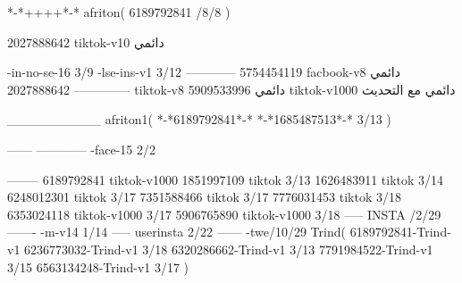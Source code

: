 *-*++++*-*
afriton(
6189792841 /8/8
)

2027888642 tiktok-v10
دائمي

-in-no-se-16 3/9
-lse-ins-v1 3/12
------------
5754454119 facbook-v8
دائمي
--------------
2027888642 tiktok-v8
دائمي
5909533996 tiktok-v1000
دائمي مع التحديث

__________
afriton1(
*-*6189792841*-*
*-*1685487513*-* 3/13
)


------
------------
-face-15 2/2

--------
6189792841 tiktok-v1000
1851997109 tiktok 3/13
1626483911 tiktok 3/14
6248012301 tiktok 3/17
7351588466 tiktok 3/17
7776031453 tiktok 3/18
6353024118 tiktok-v1000 3/17
5906765890 tiktok-v1000 3/18
-----
 INSTA /2/29
-------
-m-v14 1/14
-----
userinsta 2/22
------
-twe/10/29
Trind(
6189792841-Trind-v1 
6236773032-Trind-v1 3/18
6320286662-Trind-v1 3/13
7791984522-Trind-v1 3/15
6563134248-Trind-v1 3/17
)
